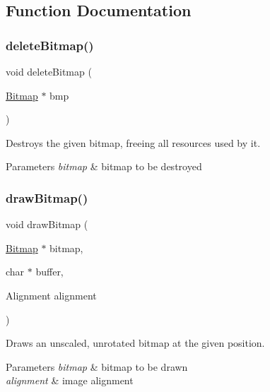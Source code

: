 \subsection{Function Documentation}
\hypertarget{group___bitmap_ga08c1d4f4fff81df260d979ea8fc1aa61}{}\label{group___bitmap_ga08c1d4f4fff81df260d979ea8fc1aa61} 
\subsubsection{\texorpdfstring{delete\+Bitmap()}{deleteBitmap()}}
{\footnotesize\ttfamily void delete\+Bitmap (\begin{DoxyParamCaption}\item[{\hyperlink{struct_bitmap}{Bitmap} $\ast$}]{bmp }\end{DoxyParamCaption})}



Destroys the given bitmap, freeing all resources used by it. 


\begin{DoxyParams}{Parameters}
{\em bitmap} & bitmap to be destroyed \\
\hline
\end{DoxyParams}
\hypertarget{group___bitmap_gaff908de4d166dac85027695204508ff4}{}\label{group___bitmap_gaff908de4d166dac85027695204508ff4} 
\subsubsection{\texorpdfstring{draw\+Bitmap()}{drawBitmap()}}
{\footnotesize\ttfamily void draw\+Bitmap (\begin{DoxyParamCaption}\item[{\hyperlink{struct_bitmap}{Bitmap} $\ast$}]{bitmap,  }\item[{char $\ast$}]{buffer,  }\item[{Alignment}]{alignment }\end{DoxyParamCaption})}



Draws an unscaled, unrotated bitmap at the given position. 


\begin{DoxyParams}{Parameters}
{\em bitmap} & bitmap to be drawn \\
\hline
{\em alignment} & image alignment \\
\hline
\end{DoxyParams}
\hypertarget{group___bitmap_gad47a5ba782d17f94ad9f08956d61660a}{}\label{group___bitmap_gad47a5ba782d17f94ad9f08956d61660a} 
